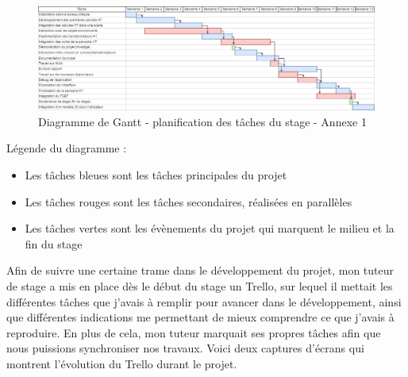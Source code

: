 \documentclass[a4paper]{article}
\begin{document}
     \begin{figure}[H]
        \centering 
        \includegraphics[scale=0.375]{img/GanttStage}
        \caption{Diagramme de Gantt - planification des tâches du stage - Annexe 1}
     \end{figure}

     Légende du diagramme : 
     \begin{itemize}
        \item Les tâches bleues sont les tâches principales du projet \\
        \item Les tâches rouges sont les tâches secondaires, réalisées en parallèles\\
        \item Les tâches vertes sont les évènements du projet qui marquent le milieu et la fin du stage \\
     \end{itemize}

     Afin de suivre une certaine trame dans le développement du projet, mon tuteur de stage a mis en place dès le début du stage un Trello, sur lequel il mettait les différentes tâches que j'avais à remplir pour avancer dans le développement, ainsi que différentes indications me permettant de mieux comprendre ce que j'avais à reproduire. En plus de cela, mon tuteur marquait ses propres tâches afin que nous puissions synchroniser nos travaux. Voici deux captures d'écrans qui montrent l'évolution du Trello durant le projet. \\
\end{document}
